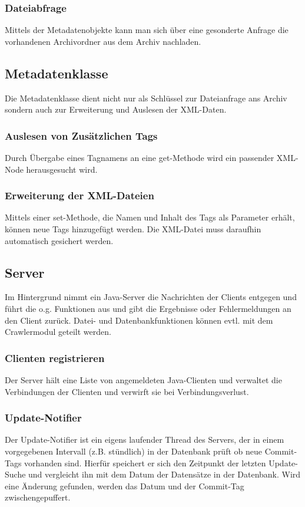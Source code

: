 	\subsubsection{Dateiabfrage} \label{spec:req:jcs:client:fsquery}
		Mittels der Metadatenobjekte kann man sich über eine gesonderte Anfrage die vorhandenen Archivordner aus dem Archiv nachladen.
\subsection{Metadatenklasse} \label{spec:req:jcs:meta}
	Die Metadatenklasse dient nicht nur als Schlüssel zur Dateianfrage ans Archiv sondern auch zur Erweiterung und Auslesen der XML-Daten.
	\subsubsection{Auslesen von Zusätzlichen Tags} \label{spec:req:jcs:meta:select}
		Durch Übergabe eines Tagnamens an eine get-Methode wird ein passender XML-Node herausgesucht wird.
	\subsubsection{Erweiterung	der XML-Dateien} \label{spec:req:jcs:meta:insert}
		Mittels einer set-Methode, die Namen und Inhalt des Tags als Parameter erhält, können neue Tags hinzugefügt werden.
		Die XML-Datei muss daraufhin automatisch gesichert werden.
\subsection{Server} \label{spec:req:jcs:server}
	Im Hintergrund nimmt ein Java-Server die Nachrichten der Clients entgegen
	und führt die o.g. Funktionen aus und gibt die Ergebnisse oder Fehlermeldungen an den Client zurück.
	Datei- und Datenbankfunktionen können evtl. mit dem Crawlermodul geteilt werden.
	\subsubsection{Clienten registrieren} \label{spec:req:jcs:server:register}
		Der Server hält eine Liste von angemeldeten Java-Clienten und verwaltet die Verbindungen der Clienten und verwirft sie bei Verbindungsverlust.
	\subsubsection{Update-Notifier} \label{spec:req:jcs:server:notifier}
		Der Update-Notifier ist ein eigens laufender Thread des Servers, der in einem vorgegebenen Intervall (z.B. stündlich) in der Datenbank prüft ob neue Commit-Tags vorhanden sind.
		Hierfür speichert er sich den Zeitpunkt der letzten Update-Suche und vergleicht ihn mit dem Datum der Datensätze in der Datenbank.
		Wird eine Änderung gefunden, werden das Datum und der Commit-Tag zwischengepuffert.
